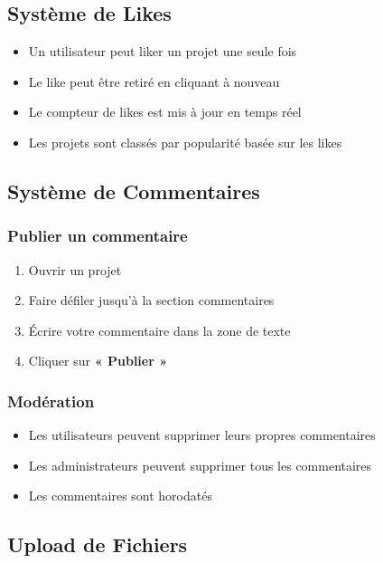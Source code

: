 \documentclass[12pt,a4paper]{article}
\begin{document}
\subsection{Système de Likes}

\begin{itemize}[leftmargin=*]
    \item Un utilisateur peut liker un projet une seule fois
    \item Le like peut être retiré en cliquant à nouveau
    \item Le compteur de likes est mis à jour en temps réel
    \item Les projets sont classés par popularité basée sur les likes
\end{itemize}

\subsection{Système de Commentaires}

\subsubsection{Publier un commentaire}
\begin{enumerate}[leftmargin=*]
    \item Ouvrir un projet
    \item Faire défiler jusqu'à la section commentaires
    \item Écrire votre commentaire dans la zone de texte
    \item Cliquer sur \textbf{« Publier »}
\end{enumerate}

\subsubsection{Modération}
\begin{itemize}[leftmargin=*]
    \item Les utilisateurs peuvent supprimer leurs propres commentaires
    \item Les administrateurs peuvent supprimer tous les commentaires
    \item Les commentaires sont horodatés
\end{itemize}

\subsection{Upload de Fichiers}
\end{document}
